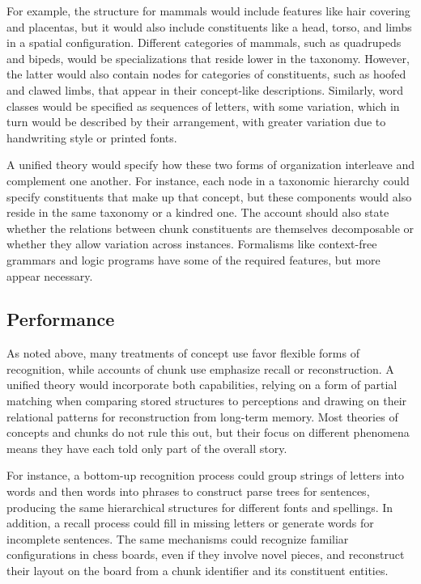 \documentclass[11pt,letterpaper]{article}
\begin{document}
For example, the structure for mammals would include features like
hair covering and placentas, but it would also include constituents
like a head, torso, and limbs in a spatial configuration. Different
categories of mammals, such as quadrupeds and bipeds, would be
specializations that reside lower in the taxonomy. However, the 
latter would also contain nodes for categories of constituents, 
such as hoofed and clawed limbs, that appear in their concept-like
descriptions. Similarly, word classes would be specified as sequences 
of letters, with some variation, which in turn would be described by 
their arrangement, with greater variation due to handwriting style 
or printed fonts. 


A unified theory would specify how these two forms of organization 
interleave and complement one another. For instance, each node in
a taxonomic hierarchy could specify constituents that make up that 
concept, but these components would also reside in the same taxonomy 
or a kindred one. The account should also state whether the relations 
between chunk constituents are themselves decomposable or whether
they allow variation across instances. Formalisms like context-free
grammars and logic programs have some of the required features, but 
more appear necessary. 

\subsection{Performance} 

As noted above, many treatments of concept use favor flexible forms
of recognition, while accounts of chunk use emphasize recall or 
reconstruction. A unified theory would incorporate both capabilities,
relying on a form of partial matching when comparing stored structures
to perceptions and drawing on their relational patterns for reconstruction 
from long-term memory. Most theories of concepts and chunks do not 
rule this out, but their focus on different phenomena means they have
each told only part of the overall story. 

For instance, a bottom-up recognition process could group strings
of letters into words and then words into phrases to construct parse
trees for sentences, producing the same hierarchical structures for 
different fonts and spellings. In addition, a recall process could 
fill in missing letters or generate words for incomplete sentences.
The same mechanisms could recognize familiar configurations in chess
boards, even if they involve novel pieces, and reconstruct their layout
on the board from a chunk identifier and its constituent entities. 
\end{document}
